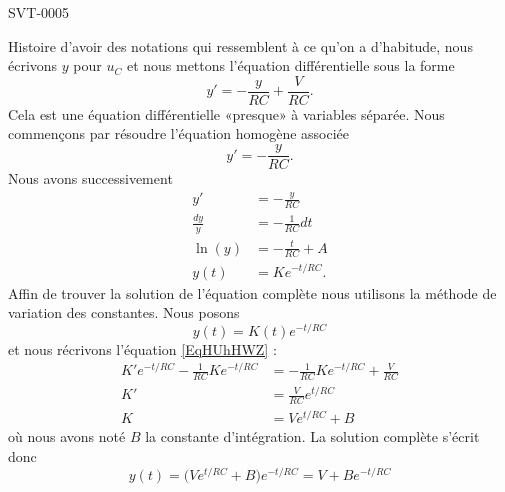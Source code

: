 
\begin{corrige}{SVT-0005}

    Histoire d'avoir des notations qui ressemblent à ce qu'on a d'habitude, nous écrivons \( y\) pour \( u_C\) et nous mettons l'équation différentielle sous la forme
    \begin{equation}        \label{EqHUhHWZ}
        y'=-\frac{ y }{ RC }+\frac{ V }{ RC }.
    \end{equation}
    Cela est une équation différentielle «presque» à variables séparée. Nous commençons par résoudre l'équation homogène associée
    \begin{equation}
        y'=-\frac{ y }{ RC }.
    \end{equation}
    Nous avons successivement
    \begin{subequations}
        \begin{align}
            y'&=-\frac{ y }{ RC }\\
            \frac{ dy }{ y }&=-\frac{1}{ RC }dt\\
            \ln(y)&=-\frac{ t }{ RC }+A\\
            y(t)&=K e^{-t/RC}.
        \end{align}
    \end{subequations}
    Affin de trouver la solution de l'équation complète nous utilisons la méthode de variation des constantes. Nous posons
    \begin{equation}
        y(t)=K(t) e^{-t/RC}
    \end{equation}
    et nous récrivons l'équation \eqref{EqHUhHWZ} :
    \begin{subequations}
        \begin{align}
            K' e^{-t/RC}-\frac{1}{ RC }K e^{-t/RC}&=-\frac{1}{ RC }K e^{-t/RC}+\frac{ V }{ RC }\\
            K'&=\frac{ V }{ RC } e^{t/RC}\\
            K&=V e^{t/RC}+B
        \end{align}
    \end{subequations}
    où nous avons noté \( B\) la constante d'intégration. La solution complète s'écrit donc
    \begin{equation}
        y(t)=\big( V e^{t/RC}+B \big) e^{-t/RC}=V+B e^{-t/RC}
    \end{equation}

\end{corrige}
